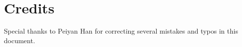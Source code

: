 \section{Credits}

Special thanks to Peiyan Han for correcting several mistakes and typos in this document.